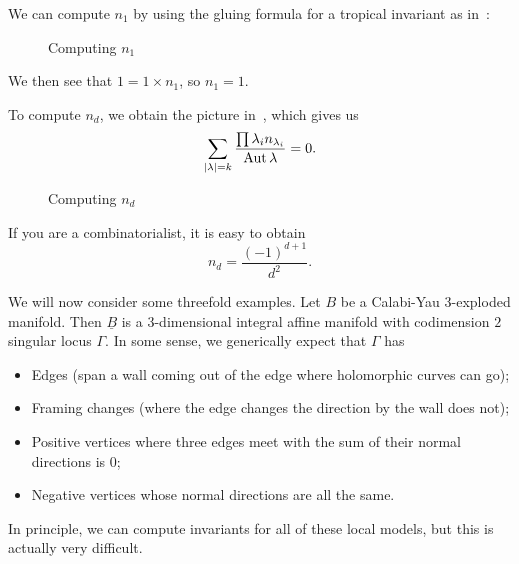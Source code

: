 \documentclass[leqno, openany]{memoir}
\theoremstyle{definition}
\theoremstyle{remark}
\theoremstyle{plain}
\theoremstyle{definition}
\theoremstyle{remark}
\newcommand{\ul}[1]{\underline{#1}}
\DeclareMathOperator{\Aut}{Aut}
\begin{document}
We can compute $n_1$ by using the gluing formula for a tropical invariant as in~:
\begin{figure}[h]
  \centering
  \caption{Computing $n_1$}
  \label{fig:n1}
\end{figure}
We then see that $1 = 1 \times n_1$, so $n_1 = 1$.

To compute $n_d$, we obtain the picture in~, which gives us
\[ \sum_{\abs{\lambda} = k} \frac{\prod \lambda_i n_{\lambda_i}}{\Aut \lambda} = 0. \]
\begin{figure}[h]
  \centering
  \caption{Computing $n_d$}
  \label{fig:nd}
\end{figure}
If you are a combinatorialist, it is easy to obtain
\[ n_d = \frac{(-1)^{d+1}}{d^2}. \]

We will now consider some threefold examples. Let $B$ be a Calabi-Yau 3-exploded manifold. Then $\ul{B}$ is a $3$-dimensional integral affine manifold with codimension $2$ singular locus $\Gamma$. In some sense, we generically expect that $\Gamma$ has
\begin{itemize}
\item Edges (span a wall coming out of the edge where holomorphic curves can go);
\item Framing changes (where the edge changes the direction by the wall does not);
\item Positive vertices where three edges meet with the sum of their normal directions is $0$;
\item Negative vertices whose normal directions are all the same.
\end{itemize}
In principle, we can compute invariants for all of these local models, but this is actually very difficult.
\end{document}
